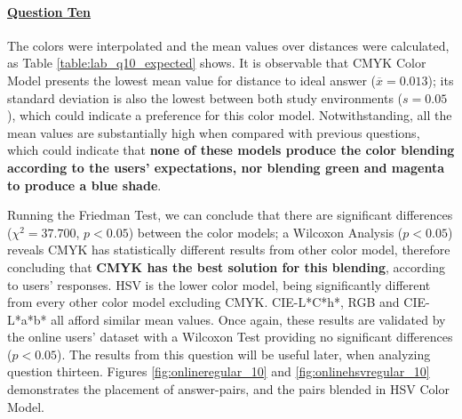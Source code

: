 \paragraph{\ul{Question Ten}}
%
The colors were interpolated and the mean values over distances were calculated, as Table \ref{table:lab_q10_expected} shows. It is observable that CMYK Color Model presents
the lowest mean value for distance to ideal answer ($\overline{x} = 0.013$); its standard deviation is also the lowest between both study environments ($s = 0.05$), which could indicate a preference
for this color model. Notwithstanding, all the mean values are substantially high when compared with previous questions, which could indicate that \textbf{none of these models produce the color blending according
to the users' expectations, nor blending green and magenta to produce a blue shade}. \par
%
Running the Friedman Test, we can conclude that there are significant differences ($\chi^2 = 37.700$, $p < 0.05$) between the color models; a Wilcoxon Analysis ($p < 0.05$) reveals
CMYK has statistically different results from other color model, therefore concluding that \textbf{CMYK has the best solution for this blending}, according to
users' responses. HSV is the lower color model, being significantly different from every other color model excluding CMYK. CIE-L*C*h*, RGB and CIE-L*a*b* all afford similar mean values.
Once again, these results are validated by the online users' dataset with a Wilcoxon Test providing no significant differences ($p < 0.05$). The results from this question will be useful later, when
analyzing question thirteen. Figures \ref{fig:onlineregular_10} and \ref{fig:onlinehsvregular_10} demonstrates the placement of answer-pairs, and the pairs blended in HSV Color Model.
%
